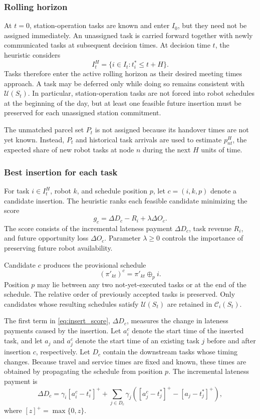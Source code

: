 \documentclass[11pt,oneside]{article}
\begin{document}
\subsubsection{Rolling horizon}

At \(t=0\), station-operation tasks are known and enter \(I_0\), but they need
not be assigned immediately. An unassigned task is carried forward together
with newly communicated tasks at subsequent decision times. At decision time
\(t\), the heuristic considers
\[
I_t^H
=
\{i\in I_t:t_i^*\leq t+H\}.
\]
Tasks therefore enter the active rolling horizon as their desired meeting
times approach. A task may be deferred only while doing so remains consistent
with \(\mathcal U(S_t)\). In particular, station-operation tasks are not
forced into robot schedules at the beginning of the day, but at least one
feasible future insertion must be preserved for each unassigned station
commitment.

The unmatched parcel set \(P_t\) is not assigned because its handover times
are not yet known. Instead, \(P_t\) and historical task arrivals are used to
estimate \(p_{nt}^H\), the expected share of new robot tasks at node \(n\)
during the next \(H\) units of time.

\subsubsection{Best insertion for each task}

For task \(i\in I_t^H\), robot \(k\), and schedule position \(p\), let
\(c=(i,k,p)\) denote a candidate insertion. The heuristic ranks each feasible
candidate minimizing the score
\begin{equation}\label{eq:insert_score}
g_c
=
\Delta D_c-R_i+\lambda\Delta O_c.
\end{equation}
The score consists of the incremental lateness payment \(\Delta D_c\), task
revenue \(R_i\), and future opportunity loss \(\Delta O_c\). Parameter
\(\lambda\geq0\) controls the importance of preserving future robot
availability.

Candidate \(c\) produces the provisional schedule
\[
\left(\pi'_{kt}\right)^{c}=\pi'_{kt}\oplus_p i.
\]
Position \(p\) may lie between any two not-yet-executed tasks or at the end of
the schedule. The relative order of previously accepted tasks is preserved.
Only candidates whose resulting schedules satisfy \(\mathcal U(S_t)\) are
retained in \(\mathcal C_i(S_t)\).

The first term in \eqref{eq:insert_score}, \(\Delta D_c\), measures the change in lateness payments
caused by the insertion. Let \(a_i^c\) denote the start time of the inserted
task, and let \(a_j\) and
\(a_j^c\) denote the start time of an existing task \(j\) before and after
insertion \(c\), respectively. Let \(D_c\) contain the downstream tasks whose
timing changes. Because travel and service times are fixed and known, these
times are obtained by propagating the schedule from position \(p\). The
incremental lateness payment is
\[
\Delta D_c
=
\gamma_i\left[a_i^c-t_i^*\right]^+
+
\sum_{j\in D_c}
\gamma_j
\left(
\left[a_j^c-t_j^*\right]^+
-
\left[a_j-t_j^*\right]^+
\right),
\]
where \([z]^+=\max\{0,z\}\).
\end{document}
